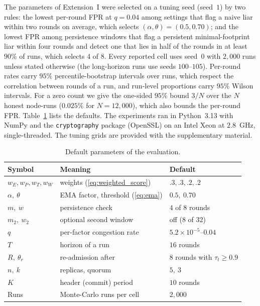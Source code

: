\documentclass{ieeeaccess}
\begin{document}
The parameters of Extension~I were selected on a tuning seed (seed~$1$)
by two rules: the lowest per-round FPR at $q=0.04$ among settings that
flag a naive liar within two rounds on average, which selects
$(\alpha,\theta)=(0.5,0.70)$; and the lowest FPR among persistence
windows that flag a persistent minimal-footprint liar within four
rounds and detect one that lies in half of the rounds in at least
$90\%$ of runs, which selects $4$ of $8$.  Every reported cell uses
seed~$0$ with $2{,}000$ runs unless stated otherwise (the long-horizon
runs use seeds $100$--$105$).  Per-round rates carry $95\%$
percentile-bootstrap intervals over runs, which respect the correlation
between rounds of a run, and run-level proportions carry $95\%$ Wilson
intervals.  For a zero count we give the one-sided $95\%$ bound $3/N$
over the $N$ honest node-runs ($0.025\%$ for $N=12{,}000$), which also
bounds the per-round FPR.  Table~\ref{tab:params} lists the defaults.
The experiments ran in Python~3.13 with NumPy and the
\texttt{cryptography} package (OpenSSL) on an Intel Xeon at $2.8$~GHz,
single-threaded.  The tuning grids are provided with the
supplementary material.

\begin{table}[!t]
\caption{Default parameters of the evaluation.}
\label{tab:params}
\centering
\renewcommand{\arraystretch}{1.1}
\footnotesize
\setlength{\tabcolsep}{3pt}
\begin{tabular}{lll}
\toprule
\textbf{Symbol} & \textbf{Meaning} & \textbf{Default} \\
\midrule
$w_E,w_P,w_T,w_W$ & weights (\ref{eq:weighted_score}) & $.3,.3,.2,.2$ \\
$\alpha,\ \theta$ & EMA factor, threshold (\ref{eq:ema}) & $0.5,\ 0.70$ \\
$m,\ w$ & persistence check & $4$ of $8$ rounds \\
$m_2,\ w_2$ & optional second window & off ($8$ of $32$) \\
$q$ & per-factor congestion rate & $5.2\times10^{-5}$--$0.04$ \\
$T$ & horizon of a run & $16$ rounds \\
$R,\ \theta_r$ & re-admission after & $8$ rounds with $\tau_t\ge0.9$ \\
$n,\ k$ & replicas, quorum & $5,\ 3$ \\
$K$ & header (commit) period & $10$ rounds \\
Runs & Monte-Carlo runs per cell & $2{,}000$ \\
\bottomrule
\end{tabular}
\end{table}
\end{document}
